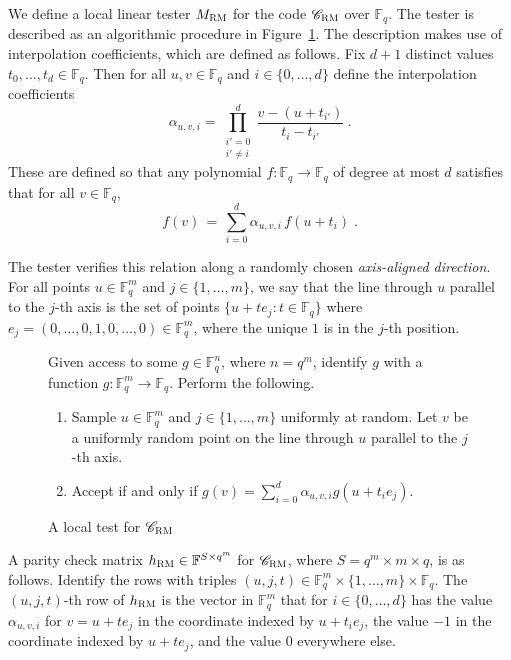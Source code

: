 \documentclass[11pt]{article}
\theoremstyle{definition}
\newcommand{\code}{\mathscr{C}}
\newcommand{\F}{\ensuremath{\mathbb{F}}}
\newcommand{\RM}{\ensuremath{\textsc{RM}}}
\newenvironment{gamespec}{
  \begin{mdframed}[style=figstyle]}{
  \end{mdframed}}
\begin{document}
We define a local linear tester $M_{\RM}$ for the code $\code_\RM$ over $\F_q$. The tester is described as an algorithmic procedure in Figure~\ref{fig:RM-tester}. %
The description makes use of interpolation coefficients, which are defined as follows. Fix $d+1$ distinct values $t_0,\ldots,t_d \in \F_q$. Then for all $u,v \in \F_q$ and $i \in \{0,\ldots,d\}$ define the interpolation coefficients
 \begin{equation}\label{eq:interp-coeff}
 \alpha_{u,v,i} = \prod_{\substack{i'=0\\i'\neq i}}^{d}  \frac{v - (u + t_{i'})}{t_i - t_{i'}}~.
 \end{equation}
These are defined so that any polynomial $f:\F_q\to\F_q$ of degree at most $d$ satisfies
that for all $v \in \F_q$, 
\[ f(v)\,=\, \sum_{i=0}^{d} \alpha_{u,v,i} \, f(u+t_i)\;.\]

The tester verifies this relation along a randomly chosen \emph{axis-aligned direction}.  For all points $u \in \F_q^m$ and $j \in \{1,\ldots,m\}$, we say that the line through $u$ parallel to the $j$-th axis is the set of points $\{ u + te_j : t \in \F_q \}$ where $e_j=(0,\ldots,0,1,0,\ldots,0)\in \F_q^m$, where the unique $1$ is in the $j$-th position. 


\begin{figure}[!htbp]
  \centering
  \begin{gamespec}
Given access to some $g\in \F_q^n$, where $n=q^m$, identify $g$ with a function $g:\F_q^m\to \F_q$. Perform the following.
\begin{enumerate}
	\item Sample	$u\in \F_q^m$ and $j\in \{1,\ldots,m\}$ uniformly at random. Let $v$ be a uniformly random point on the line through $u$ parallel to the $j$-th axis.
	\item 
	Accept if and only if $g(v) = \sum_{i=0}^{d} \alpha_{u,v,i} g(u+t_i e_j)$. 
    \end{enumerate}
  \end{gamespec}
  \caption{A local test for $\code_{\RM}$}
  \label{fig:RM-tester}
\end{figure}

A parity check matrix $h_{\RM} \in \F^{S \times q^m}$ for $\code_{\RM}$, where $S = q^m \times m \times q$, is as follows. Identify the rows with triples $(u,j,t) \in \F_q^m \times \{1,\ldots,m\} \times \F_q$. The $(u,j,t)$-th row of $h_{\RM}$ is the vector in $\F_q^m$ that for $i \in \{0,\ldots,d\}$ has the value $\alpha_{u,v,i}$ for $v = u + t e_j$ in the coordinate indexed by $u + t_i e_j$, the value $-1$ in the coordinate indexed by $u + te_j$, and the value $0$ everywhere else. 
\end{document}
